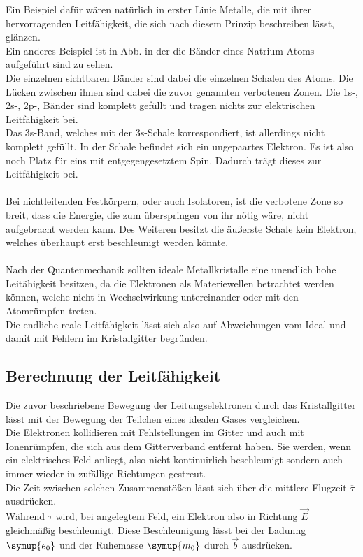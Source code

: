 \noindent
Ein Beispiel dafür wären natürlich in erster Linie Metalle, die mit ihrer hervorragenden Leitfähigkeit, die sich nach diesem Prinzip beschreiben lässt, glänzen.\\
Ein anderes Beispiel ist in Abb. in der die Bänder eines Natrium-Atoms aufgeführt sind zu sehen.\\
Die einzelnen sichtbaren Bänder sind dabei die einzelnen Schalen des Atoms.
Die Lücken zwischen ihnen sind dabei die zuvor genannten verbotenen Zonen.
Die 1s-, 2s-, 2p-, Bänder sind komplett gefüllt und tragen nichts zur elektrischen Leitfähigkeit bei.\\
Das 3s-Band, welches mit der 3s-Schale korrespondiert, ist allerdings nicht komplett gefüllt.
In der Schale befindet sich ein ungepaartes Elektron. Es ist also noch Platz für eins mit entgegengesetztem Spin.
Dadurch trägt dieses zur Leitfähigkeit bei.\\\\
\noindent
Bei nichtleitenden Festkörpern, oder auch Isolatoren, ist die verbotene Zone so breit, dass die Energie, 
die zum überspringen von ihr nötig wäre, nicht aufgebracht werden kann. Des Weiteren besitzt die äußerste Schale kein Elektron, welches
überhaupt erst beschleunigt werden könnte.\\\\
\noindent
Nach der Quantenmechanik sollten ideale Metallkristalle eine unendlich hohe Leitähigkeit besitzen, da
die Elektronen als Materiewellen betrachtet werden können, welche nicht in Wechselwirkung untereinander oder mit den Atomrümpfen treten.\\
Die endliche reale Leitfähigkeit lässt sich also auf Abweichungen vom Ideal und damit mit Fehlern im Kristallgitter begründen.\\


\subsection{Berechnung der Leitfähigkeit}

Die zuvor beschriebene Bewegung der Leitungselektronen durch das Kristallgitter lässt 
mit der Bewegung der Teilchen eines idealen Gases vergleichen.\\
Die Elektronen kollidieren mit Fehlstellungen im Gitter und auch mit Ionenrümpfen, die sich aus dem Gitterverband entfernt haben.
Sie werden, wenn ein elektrisches Feld anliegt, also nicht kontinuirlich beschleunigt sondern auch immer wieder in zufällige Richtungen gestreut.\\
Die Zeit zwischen solchen Zusammenstößen lässt sich über die mittlere Flugzeit $\overline{\tau}$ ausdrücken.\\
Während $\overline{\tau}$ wird, bei angelegtem Feld, ein Elektron also in Richtung $\vec{E}$ gleichmäßig beschleunigt.
Diese Beschleunigung lässt bei der Ladunng $\symup{e_0}$ und der Ruhemasse $\symup{m_0}$ durch $\vec{b}$ ausdrücken.

